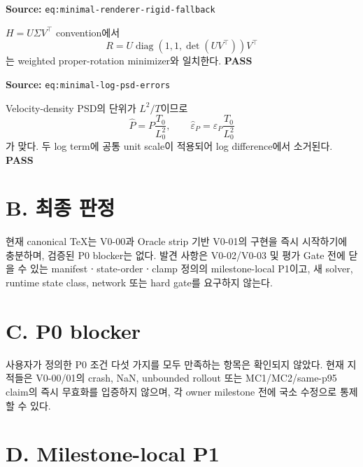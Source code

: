 \documentclass[11pt]{article}
\newcommand{\src}[1]{\textcolor{CoreBlue}{\nolinkurl{#1}}}
\newcommand{\pass}{\textcolor{SafeGreen}{\textbf{PASS}}}
\begin{document}
\begin{tcolorbox}[breakable,colback=white,colframe=black!35,title=Proper Kabsch fallback,fonttitle=\bfseries]
\textbf{Source:} \src{eq:minimal-renderer-rigid-fallback}

$H=U\Sigma V^\top$ convention에서
\[
R
=U\operatorname{diag}\left(1,1,\det(UV^\top)\right)V^\top
\]
는 weighted proper-rotation minimizer와 일치한다. \pass
\end{tcolorbox}

\begin{tcolorbox}[breakable,colback=white,colframe=black!35,title=PSD unit map,fonttitle=\bfseries]
\textbf{Source:} \src{eq:minimal-log-psd-errors}

Velocity-density PSD의 단위가 $L^2/T$이므로
\[
\widehat P=P\frac{T_0}{L_0^2},
\qquad
\widehat\varepsilon_P=\varepsilon_P\frac{T_0}{L_0^2}
\]
가 맞다. 두 log term에 공통 unit scale이 적용되어 log difference에서 소거된다. \pass
\end{tcolorbox}

\section{B. 최종 판정}

\begin{tcolorbox}[colback=SafeLight,colframe=SafeGreen,title=IMPLEMENT,fonttitle=\bfseries]
현재 canonical TeX는 V0-00과 Oracle strip 기반 V0-01의 구현을 즉시 시작하기에 충분하며,
검증된 P0 blocker는 없다. 발견 사항은 V0-02/V0-03 및 평가 Gate 전에 닫을 수 있는
manifestㆍstate-orderㆍclamp 정의의 milestone-local P1이고,
새 solver, runtime state class, network 또는 hard gate를 요구하지 않는다.
\end{tcolorbox}

\section{C. P0 blocker}

\begin{tcolorbox}[colback=SafeLight,colframe=SafeGreen,title=P0 blocker: 없음,fonttitle=\bfseries]
사용자가 정의한 P0 조건 다섯 가지를 모두 만족하는 항목은 확인되지 않았다.
현재 지적들은 V0-00/01의 crash, NaN, unbounded rollout 또는 MC1/MC2/same-p95 claim의 즉시 무효화를
입증하지 않으며, 각 owner milestone 전에 국소 수정으로 통제할 수 있다.
\end{tcolorbox}

\section{D. Milestone-local P1}
\end{document}
